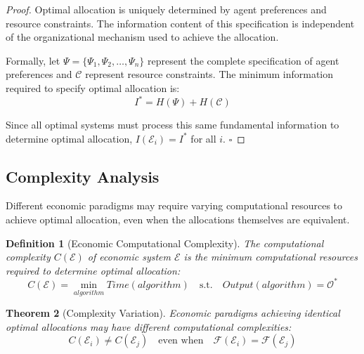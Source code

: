 \documentclass[12pt,a4paper]{article}
\newtheorem{theorem}{Theorem}
\newtheorem{definition}[theorem]{Definition}
\begin{document}
\begin{proof}
Optimal allocation is uniquely determined by agent preferences and resource constraints. The information content of this specification is independent of the organizational mechanism used to achieve the allocation. 

Formally, let $\Psi = \{\Psi_1, \Psi_2, \ldots, \Psi_n\}$ represent the complete specification of agent preferences and $\mathcal{C}$ represent resource constraints. The minimum information required to specify optimal allocation is:
\begin{equation}
I^* = H(\Psi) + H(\mathcal{C})
\end{equation}

Since all optimal systems must process this same fundamental information to determine optimal allocation, $I(\mathcal{E}_i) = I^*$ for all $i$. $\square$
\end{proof}

\subsection{Complexity Analysis}

Different economic paradigms may require varying computational resources to achieve optimal allocation, even when the allocations themselves are equivalent.

\begin{definition}[Economic Computational Complexity]
The computational complexity $C(\mathcal{E})$ of economic system $\mathcal{E}$ is the minimum computational resources required to determine optimal allocation:
\begin{equation}
C(\mathcal{E}) = \min_{algorithm} Time(algorithm) \quad \text{s.t.} \quad Output(algorithm) = \mathcal{O}^*
\end{equation}
\end{definition}

\begin{theorem}[Complexity Variation]
Economic paradigms achieving identical optimal allocations may have different computational complexities:
\begin{equation}
C(\mathcal{E}_i) \neq C(\mathcal{E}_j) \quad \text{even when} \quad \mathcal{F}(\mathcal{E}_i) = \mathcal{F}(\mathcal{E}_j)
\end{equation}
\end{theorem}
\end{document}
